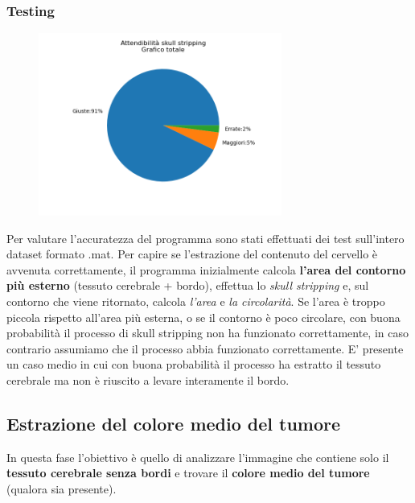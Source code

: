 \documentclass{article}
\begin{document}
\subsubsection{Testing}

\begin{figure}
    \includegraphics[width=8cm]{images/ss.png}
\end{figure}

Per valutare l'accuratezza del programma sono stati effettuati dei test sull'intero dataset formato .mat.
Per capire se l'estrazione del contenuto del cervello è avvenuta correttamente, il programma inizialmente calcola \textbf{l'area 
del contorno più esterno} (tessuto cerebrale + bordo), effettua lo \textit{skull stripping} e, sul contorno che viene ritornato, 
calcola \textit{l'area} e \textit{la circolarità}.
Se l'area è troppo piccola rispetto all'area più esterna, o se il contorno è poco circolare, con buona probabilità il processo di skull stripping 
non ha funzionato correttamente, in caso contrario assumiamo che il processo abbia funzionato correttamente.
E' presente un caso medio in cui con buona probabilità il processo ha estratto il tessuto cerebrale ma non è riuscito a 
levare interamente il bordo.

\bigskip
\subsection{Estrazione del colore medio del tumore}
In questa fase l'obiettivo è quello di analizzare l'immagine che contiene solo il \textbf{tessuto cerebrale senza bordi} e 
trovare il \textbf{colore medio del tumore} (qualora sia presente).
\end{document}
